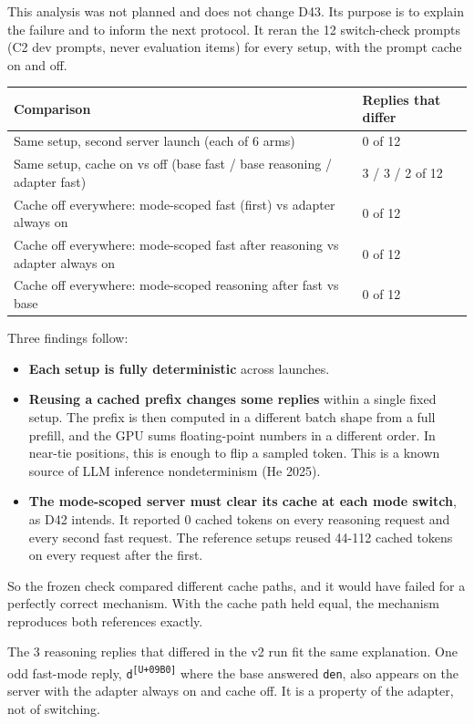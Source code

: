 \documentclass[11pt,a4paper]{article}
\newcommand{\code}[1]{\texttt{#1}}
\begin{document}
This analysis was not planned and does not change D43. Its purpose is to explain the failure and to inform the next protocol. It reran the 12 switch-check prompts (C2 dev prompts, never evaluation items) for every setup, with the prompt cache on and off.

\begin{table}[H]\centering\small
\begin{tabularx}{\textwidth}{@{}lY@{}}
\toprule
Comparison & Replies that differ \\
\midrule
Same setup, second server launch (each of 6 arms) & 0 of 12 \\
Same setup, cache on vs off (base fast / base reasoning / adapter fast) & 3 / 3 / 2 of 12 \\
Cache off everywhere: mode-scoped fast (first) vs adapter always on & 0 of 12 \\
Cache off everywhere: mode-scoped fast after reasoning vs adapter always on & 0 of 12 \\
Cache off everywhere: mode-scoped reasoning after fast vs base & 0 of 12 \\
\bottomrule\end{tabularx}\end{table}

Three findings follow:

\begin{itemize}
\item \textbf{Each setup is fully deterministic} across launches.
\item \textbf{Reusing a cached prefix changes some replies} within a single fixed setup. The prefix is then computed in a different batch shape from a full prefill, and the GPU sums floating-point numbers in a different order. In near-tie positions, this is enough to flip a sampled token. This is a known source of LLM inference nondeterminism (He 2025).
\item \textbf{The mode-scoped server must clear its cache at each mode switch}, as D42 intends. It reported 0 cached tokens on every reasoning request and every second fast request. The reference setups reused 44-112 cached tokens on every request after the first.
\end{itemize}

So the frozen check compared different cache paths, and it would have failed for a perfectly correct mechanism. With the cache path held equal, the mechanism reproduces both references exactly.

The 3 reasoning replies that differed in the v2 run fit the same explanation. One odd fast-mode reply, \code{d\textsuperscript{[U+09B0]}} where the base answered \code{den}, also appears on the server with the adapter always on and cache off. It is a property of the adapter, not of switching.
\end{document}
